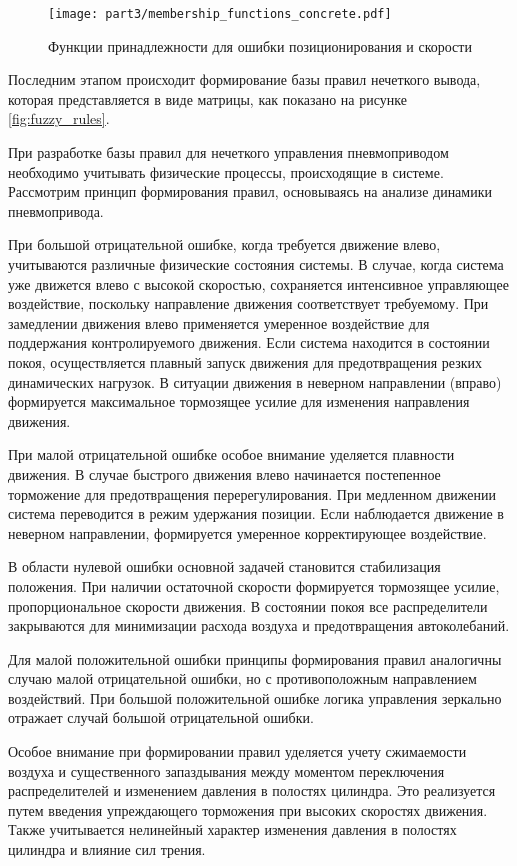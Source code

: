 \begin{figure}[ht]
	\centering
	\texttt{[image: part3/membership\_functions\_concrete.pdf]}
	\caption{Функции принадлежности для ошибки позиционирования и скорости}
	\label{fig:membership_functions_concrete}
\end{figure}

Последним этапом происходит формирование базы правил нечеткого вывода, которая представляется
в виде матрицы, как показано на рисунке \ref{fig:fuzzy_rules}.

При разработке базы правил для нечеткого управления пневмоприводом
необходимо учитывать физические процессы, происходящие в системе.
Рассмотрим принцип формирования правил, основываясь на анализе
динамики пневмопривода.

При большой отрицательной ошибке, когда требуется движение влево,
учитываются различные физические состояния системы. В случае,
когда система уже движется влево с высокой скоростью, сохраняется
интенсивное управляющее воздействие, поскольку направление движения
соответствует требуемому. При замедлении движения влево применяется
умеренное воздействие для поддержания контролируемого движения.
Если система находится в состоянии покоя, осуществляется плавный
запуск движения для предотвращения резких динамических нагрузок.
В ситуации движения в неверном направлении (вправо) формируется
максимальное тормозящее усилие для изменения направления движения.

При малой отрицательной ошибке особое внимание уделяется
плавности движения. В случае быстрого движения влево начинается
постепенное торможение для предотвращения перерегулирования.
При медленном движении система переводится в режим удержания
позиции. Если наблюдается движение в неверном направлении,
формируется умеренное корректирующее воздействие.

В области нулевой ошибки основной задачей становится стабилизация
положения. При наличии остаточной скорости формируется тормозящее
усилие, пропорциональное скорости движения. В состоянии покоя все
распределители закрываются для минимизации расхода воздуха и
предотвращения автоколебаний.

Для малой положительной ошибки принципы формирования правил
аналогичны случаю малой отрицательной ошибки, но с противоположным
направлением воздействий. При большой положительной ошибке
логика управления зеркально отражает случай большой отрицательной ошибки.

Особое внимание при формировании правил уделяется учету сжимаемости
воздуха и существенного запаздывания между моментом переключения
распределителей и изменением давления в полостях цилиндра. Это
реализуется путем введения упреждающего торможения при высоких
скоростях движения. Также учитывается нелинейный характер изменения
давления в полостях цилиндра и влияние сил трения.

